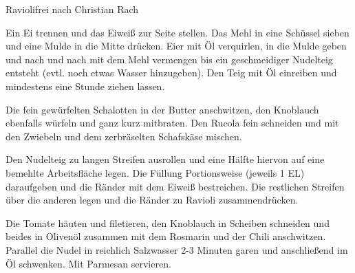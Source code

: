 \begin{recipe}{Ravioli}{frei nach Christian Rach}
  \label{Ravoli}

  
  
  \steps
  Ein Ei trennen und das Eiweiß zur Seite stellen. Das Mehl in eine Schüssel sieben und 
  eine Mulde in die Mitte drücken. Eier mit Öl verquirlen, in die Mulde geben und nach und 
  nach mit dem Mehl vermengen bis ein geschmeidiger Nudelteig entsteht (evtl. noch etwas 
  Wasser hinzugeben). Den Teig mit Öl einreiben und mindestens eine Stunde ziehen lassen.

  Die fein gewürfelten Schalotten in der Butter anschwitzen, den Knoblauch ebenfalls
  würfeln und ganz kurz mitbraten. Den Rucola fein schneiden und mit den Zwiebeln und dem
  zerbräselten Schafskäse mischen.

  Den Nudelteig zu langen Streifen ausrollen und eine Hälfte hiervon auf eine bemehlte
  Arbeitsfläche legen. Die Füllung Portionsweise (jeweils 1 EL) daraufgeben und die Ränder
  mit dem Eiweiß bestreichen. Die restlichen Streifen  über die anderen legen und die
  Ränder zu Ravioli zusammendrücken.

  Die Tomate häuten und filetieren, den Knoblauch in Scheiben schneiden und beides in
  Olivenöl zusammen mit dem Rosmarin  und der Chili anschwitzen. Parallel die Nudel in 
  reichlich Salzwasser 2-3 Minuten garen und anschließend im Öl schwenken. Mit Parmesan 
  servieren.
\end{recipe}


